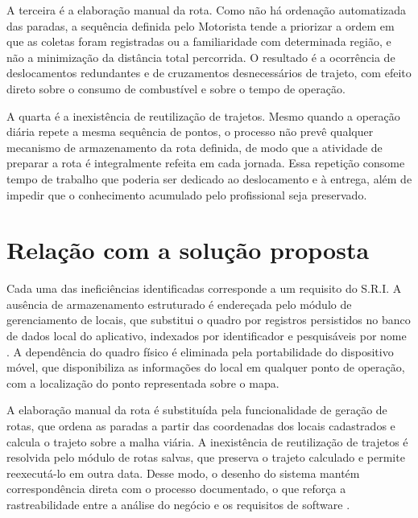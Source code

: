 A terceira é a elaboração manual da rota. Como não há ordenação automatizada das paradas, a sequência definida pelo Motorista tende a priorizar a ordem em que as coletas foram registradas ou a familiaridade com determinada região, e não a minimização da distância total percorrida. O resultado é a ocorrência de deslocamentos redundantes e de cruzamentos desnecessários de trajeto, com efeito direto sobre o consumo de combustível e sobre o tempo de operação.

A quarta é a inexistência de reutilização de trajetos. Mesmo quando a operação diária repete a mesma sequência de pontos, o processo não prevê qualquer mecanismo de armazenamento da rota definida, de modo que a atividade de preparar a rota é integralmente refeita em cada jornada. Essa repetição consome tempo de trabalho que poderia ser dedicado ao deslocamento e à entrega, além de impedir que o conhecimento acumulado pelo profissional seja preservado.

\section{Relação com a solução proposta}

Cada uma das ineficiências identificadas corresponde a um requisito do S.R.I. A ausência de armazenamento estruturado é endereçada pelo módulo de gerenciamento de locais, que substitui o quadro por registros persistidos no banco de dados local do aplicativo, indexados por identificador e pesquisáveis por nome \cite{sriEspecUC2026}. A dependência do quadro físico é eliminada pela portabilidade do dispositivo móvel, que disponibiliza as informações do local em qualquer ponto de operação, com a localização do ponto representada sobre o mapa.

A elaboração manual da rota é substituída pela funcionalidade de geração de rotas, que ordena as paradas a partir das coordenadas dos locais cadastrados e calcula o trajeto sobre a malha viária. A inexistência de reutilização de trajetos é resolvida pelo módulo de rotas salvas, que preserva o trajeto calculado e permite reexecutá-lo em outra data. Desse modo, o desenho do sistema mantém correspondência direta com o processo documentado, o que reforça a rastreabilidade entre a análise do negócio e os requisitos de software \cite{sriEspecComp2025}.
